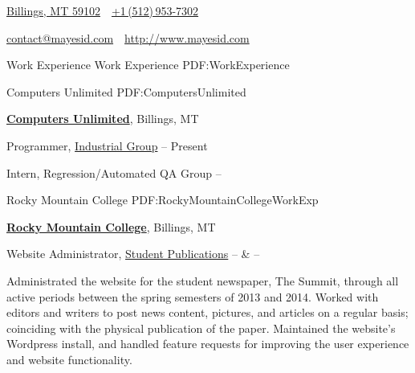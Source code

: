 \documentclass[letterpaper,MMMyyyy,nonstopmode]{simpleresumecv}
\newcommand{\CVAuthor}{Isaac Mayes}
\newcommand{\CVWebpage}{http://www.mayesid.com}
\begin{document}

\Title{\CVAuthor}

\begin{SubTitle}
\href{https://www.google.com/maps/place/Billings,+MT/}
{Billings, MT 59102}
\,\SubBulletSymbol\,
\href{tel:+15129537302}
{+1\,(512)\,953-7302}
\par
\href{mailto:contact@mayesid.com}
{contact@mayesid.com}
\,\SubBulletSymbol\,
\href{\CVWebpage}
{\url{\CVWebpage}}
\end{SubTitle}

\begin{Body}


\Section
{Work \newline Experience}
{Work Experience}
{PDF:WorkExperience}

\SubSection
{}
{Computers Unlimited}
{PDF:ComputersUnlimited}

\Entry
\href{http://www.cu.net}
{\textbf{Computers Unlimited}},
Billings, MT

\Gap
\BulletItem
Programmer,
\href{http://www.cu.net/industrial}
{Industrial Group}
\hfill
{} --
Present
\begin{Detail}
\end{Detail}

\Gap
\BulletItem
Intern,
Regression/Automated QA Group
\hfill
{} --
\begin{Detail}
\end{Detail}

\SubSection
{}
{Rocky Mountain College}
{PDF:RockyMountainCollegeWorkExp}

\Entry
\href{http://www.rocky.edu}
{\textbf{Rocky Mountain College}},
Billings, MT

\Gap
\BulletItem
Website Administrator,
\href{http://summit.rocky.edu}
{Student Publications}
\hfill
{} --
 \&
 --
\begin{Detail}
\SubBulletItem
Administrated the website for the student newspaper, The Summit, through all active periods between the spring semesters of 2013 and 2014.
\SubBulletItem
Worked with editors and writers to post news content, pictures, and articles on a regular basis; coinciding with the physical publication of the paper.
\SubBulletItem
Maintained the website's Wordpress install, and handled feature requests for improving the user experience and website functionality.
\end{Detail}


\end{Body}
\end{document}
